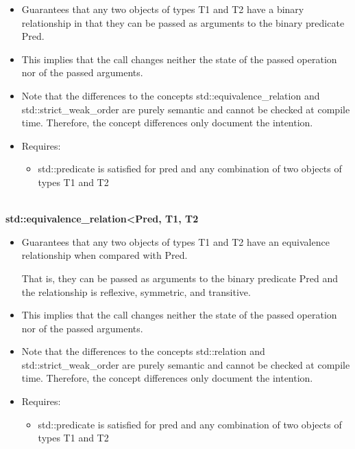 \begin{itemize}
\item
Guarantees that any two objects of types T1 and T2 have a binary relationship in that they can be passed as arguments to the binary predicate Pred.

\item
This implies that the call changes neither the state of the passed operation nor of the passed arguments.

\item
Note that the differences to the concepts std::equivalence\_relation and std::strict\_weak\_order are purely semantic and cannot be checked at compile time. Therefore, the concept differences only document the intention.

\item
Requires:
\begin{itemize}
\item
std::predicate is satisfied for pred and any combination of two objects of types T1 and T2
\end{itemize}
\end{itemize}

\noindent
\hspace*{\fill} \\ %
\textbf{std::equivalence\_relation<Pred, T1, T2}

\begin{itemize}
\item
Guarantees that any two objects of types T1 and T2 have an equivalence relationship when compared with Pred.

That is, they can be passed as arguments to the binary predicate Pred and the relationship is reflexive, symmetric, and transitive.

\item
This implies that the call changes neither the state of the passed operation nor of the passed arguments.

\item
Note that the differences to the concepts std::relation and std::strict\_weak\_order are purely semantic and cannot be checked at compile time. Therefore, the concept differences only document the intention.

\item
Requires:
\begin{itemize}
\item
std::predicate is satisfied for pred and any combination of two objects of types T1 and T2
\end{itemize}
\end{itemize}


